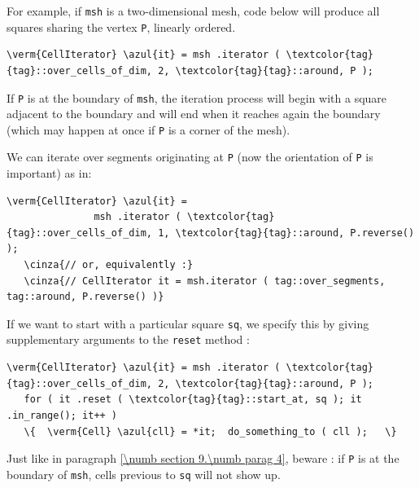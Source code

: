For example, if {\small\tt msh} is a two-dimensional mesh, code below will produce
all squares sharing the vertex {\small\tt P}, linearly ordered.

\begin{Verbatim}[commandchars=\\\{\},formatcom=\small\tt,
   baselinestretch=0.94,framesep=2mm                      ]
   \verm{CellIterator} \azul{it} = msh .iterator ( \textcolor{tag}{tag}::over_cells_of_dim, 2, \textcolor{tag}{tag}::around, P );
\end{Verbatim}

If {\small\tt P} is at the boundary of {\small\tt msh}, the iteration process will begin
with a square adjacent to the boundary and will end when it reaches again the boundary
(which may happen at once if {\small\tt P} is a corner of the mesh).

We can iterate over segments originating at {\small\tt P} (now the orientation of
{\small\tt P} is important) as in:

\begin{Verbatim}[commandchars=\\\{\},formatcom=\small\tt,
   baselinestretch=0.94,framesep=2mm                      ]
   \verm{CellIterator} \azul{it} = 
               msh .iterator ( \textcolor{tag}{tag}::over_cells_of_dim, 1, \textcolor{tag}{tag}::around, P.reverse() );
   \cinza{// or, equivalently :}
   \cinza{// CellIterator it = msh.iterator ( tag::over_segments, tag::around, P.reverse() )}
\end{Verbatim}

If we want to start with a particular square {\small\tt sq}, we specify this by giving
supplementary arguments to the {\small\tt reset} method :

\begin{Verbatim}[commandchars=\\\{\},formatcom=\small\tt,
   baselinestretch=0.94,framesep=2mm                      ]
   \verm{CellIterator} \azul{it} = msh .iterator ( \textcolor{tag}{tag}::over_cells_of_dim, 2, \textcolor{tag}{tag}::around, P );
   for ( it .reset ( \textcolor{tag}{tag}::start_at, sq ); it .in_range(); it++ )
   \{  \verm{Cell} \azul{cll} = *it;  do_something_to ( cll );   \}
\end{Verbatim}

Just like in paragraph \ref{\numb section 9.\numb parag 4}, beware : if {\small\tt P}
is at the boundary of {\small\tt msh}, cells previous to {\small\tt sq} will not
show up.

